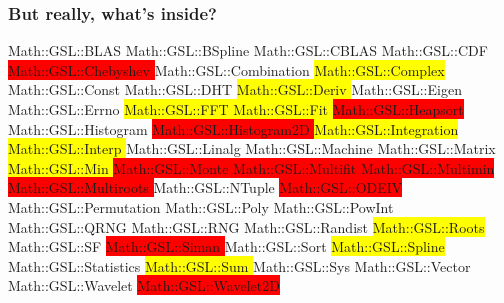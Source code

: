 \documentclass[12pt]{beamer}
\begin{document}
\begin{frame}[fragile]
    \frametitle{But really, what's inside?}
    \begin{tiny}
    Math::GSL::BLAS           
    Math::GSL::BSpline         
    Math::GSL::CBLAS           
    Math::GSL::CDF           
    \colorbox{red}{Math::GSL::Chebyshev     } 
    Math::GSL::Combination     
    \colorbox{yellow}{Math::GSL::Complex} 
    Math::GSL::Const           
    Math::GSL::DHT             
    \colorbox{yellow}{Math::GSL::Deriv           }
    Math::GSL::Eigen           
    Math::GSL::Errno           
    \colorbox{yellow}{Math::GSL::FFT            } 
    \colorbox{yellow}{Math::GSL::Fit            } 
    \colorbox{red}{Math::GSL::Heapsort       } 
    Math::GSL::Histogram       
    \colorbox{red}{Math::GSL::Histogram2D     }
    \colorbox{yellow}{Math::GSL::Integration    } 
    \colorbox{yellow}{Math::GSL::Interp         } 
    Math::GSL::Linalg          
    Math::GSL::Machine         
    Math::GSL::Matrix          
    \colorbox{yellow}{Math::GSL::Min            } 
    \colorbox{red}{Math::GSL::Monte           }
    \colorbox{red}{Math::GSL::Multifit        }
    \colorbox{red}{Math::GSL::Multimin        }
    \colorbox{red}{Math::GSL::Multiroots      }
    Math::GSL::NTuple          
    \colorbox{red}{Math::GSL::ODEIV}
    Math::GSL::Permutation     
    Math::GSL::Poly            
    Math::GSL::PowInt          
    Math::GSL::QRNG 
    Math::GSL::RNG             
    Math::GSL::Randist         
    \colorbox{yellow}{Math::GSL::Roots            }
    Math::GSL::SF               
    \colorbox{red}{Math::GSL::Siman           } 
    Math::GSL::Sort             
    \colorbox{yellow}{Math::GSL::Spline           }
    Math::GSL::Statistics       
    \colorbox{yellow}{Math::GSL::Sum             } 
    Math::GSL::Sys              
    Math::GSL::Vector           
    Math::GSL::Wavelet          
    \colorbox{red}{Math::GSL::Wavelet2D      }  
    \end{tiny}

\end{frame}
\end{document}
